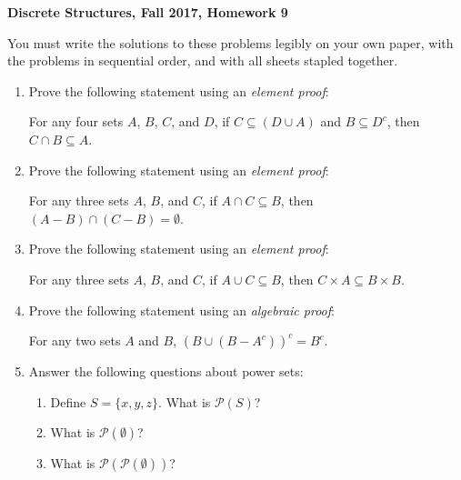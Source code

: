 \documentclass[11pt, letterpaper]{report}
\newcommand{\powerset}[1]{\mathcal P\left({#1}\right)}
\begin{document}
\textbf{Discrete Structures, Fall 2017, Homework 9}

\bigskip

You must write the solutions to these problems legibly on your own paper, with
the problems in sequential order, and with all sheets stapled together.

\begin{enumerate}

	\item Prove the following statement using an \textit{element proof}:
	
	For any four sets $A$, $B$, $C$, and $D$, if $C \subseteq (D \cup A)$ and $B \subseteq D^c$, then
	$C \cap B \subseteq A$.
	
	\item Prove the following statement using an \textit{element proof}:
	
	For any three sets $A$, $B$, and $C$, if $A \cap C \subseteq B$, then
	$(A-B) \cap (C-B) = \emptyset$.
	
	\item Prove the following statement using an \textit{element proof}:
	
	For any three sets $A$, $B$, and $C$, if $A \cup C \subseteq B$, then
	$C \times A \subseteq B \times B$.
	
	\item Prove the following statement using an \textit{algebraic proof}:
	
	For any two sets $A$ and $B$, $(B \cup (B-A^c))^c = B^c$.
	
	\item Answer the following questions about power sets:
	
	\begin{enumerate}
		\item Define $S = \{x,y,z\}$.  What is $\powerset{S}$?
		\item What is $\powerset{\emptyset}$?
		\item What is $\powerset{\powerset{\emptyset}}$?
	\end{enumerate}

\end{enumerate}
\end{document}
